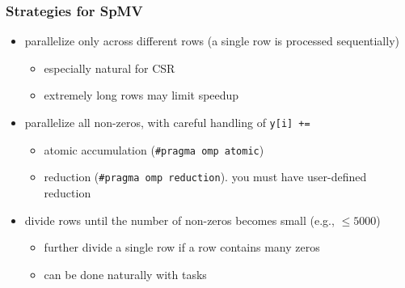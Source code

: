 \documentclass[12pt,dvipdfmx]{beamer}
\begin{document}
\begin{frame}
\frametitle{Strategies for SpMV}
\begin{itemize}
\item parallelize only across different rows
  (a single row is processed sequentially)
  \begin{itemize}
  \item especially natural for CSR
  \item extremely long rows may limit speedup
  \end{itemize}

\item parallelize all non-zeros, with careful handling of {\tt y[i] +=}
  \begin{itemize}
  \item atomic accumulation ({\tt \#pragma omp atomic})
  \item reduction ({\tt \#pragma omp reduction}).
    you must have user-defined reduction
  \end{itemize}

\item divide rows until the number of non-zeros becomes small
  (e.g., $\leq 5000$)
  \begin{itemize}
  \item further divide a single row if a row contains many zeros
  \item can be done naturally with tasks
  \end{itemize}
  
\end{itemize}
\end{frame}
\end{document}
